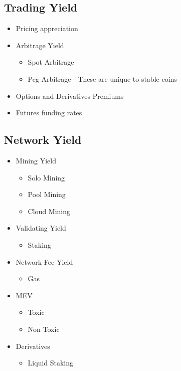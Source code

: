 \documentclass[
  letterpaper,
  DIV=11,
  numbers=noendperiod]{scrreprt}
\providecommand{\tightlist}{%
  \setlength{\itemsep}{0pt}\setlength{\parskip}{0pt}}\usepackage{longtable,booktabs,array}
\begin{document}
\subsection{Trading Yield}\label{trading-yield}

\begin{itemize}
\tightlist
\item
  Pricing appreciation
\item
  Arbitrage Yield

  \begin{itemize}
  \tightlist
  \item
    Spot Arbitrage
  \item
    Peg Arbitrage - These are unique to stable coins
  \end{itemize}
\item
  Options and Derivatives Premiums
\item
  Futures funding rates
\end{itemize}

\subsection{Network Yield}\label{network-yield}

\begin{itemize}
\tightlist
\item
  Mining Yield

  \begin{itemize}
  \tightlist
  \item
    Solo Mining
  \item
    Pool Mining
  \item
    Cloud Mining
  \end{itemize}
\item
  Validating Yield

  \begin{itemize}
  \tightlist
  \item
    Staking
  \end{itemize}
\item
  Network Fee Yield

  \begin{itemize}
  \tightlist
  \item
    Gas
  \end{itemize}
\item
  MEV

  \begin{itemize}
  \tightlist
  \item
    Toxic
  \item
    Non Toxic
  \end{itemize}
\item
  Derivatives

  \begin{itemize}
  \tightlist
  \item
    Liquid Staking
  \end{itemize}
\end{itemize}
\end{document}
